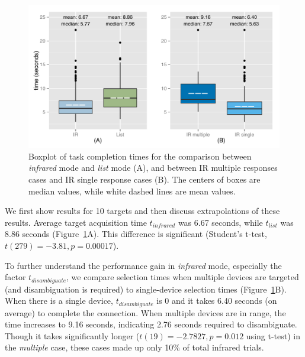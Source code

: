 \documentclass{sigchi}
\begin{document}
\begin{figure}[t]
\centering
\includegraphics[width=1.0\columnwidth]{figures/R_time_by_Category.pdf}
\caption{Boxplot of task completion times for the comparison between {\em infrared} mode and {\em list} mode (A), and between IR multiple responses cases and IR single response cases (B). The centers of boxes are median values, while white dashed lines are mean values.}
\label{fig:selection-times}
\end{figure}

We first show results for 10 targets and then discuss extrapolations of these results. Average target acquisition time $t_{infrared}$ was 6.67 seconds, while $t_{list}$ was 8.86 seconds (Figure~\ref{fig:selection-times}A). This difference is significant (Student's t-test, $t(279)=-3.81, p=0.00017$). 

To further understand the performance gain in {\em infrared} mode, especially the factor $t_{disambiguate}$, we compare selection times when multiple devices are targeted (and disambiguation is required) to single-device selection times (Figure~\ref{fig:selection-times}B). When there is a single device, $t_{disambiguate}$ is 0 and it takes 6.40 seconds (on average) to complete the connection. When multiple devices are in range, the time increases to 9.16 seconds, indicating 2.76 seconds required to disambiguate. Though it takes significantly longer ($t(19)=-2.7827, p=0.012$ using t-test) in the {\em multiple} case, these cases made up only 10\% of total infrared trials.
\end{document}
